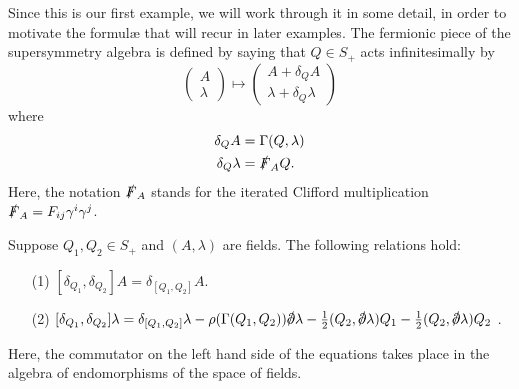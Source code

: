 \documentclass[10pt, oneside]{article}
\begin{document}
Since this is our first example, we will work through it in some detail, in order to motivate the formul\ae{} that will recur in later examples.  The fermionic piece of the supersymmetry algebra is defined by saying that $Q \in S_+$ acts infinitesimally by
\[
\begin{pmatrix}
A \\ \lambda
\end{pmatrix}
\mapsto
\begin{pmatrix} A + \delta_Q A \\
\lambda + \delta_Q \lambda
\end{pmatrix}
\]
where 
\begin{align*}
\delta_Q A &= \Gamma(Q,\lambda) \\
\delta_Q \lambda &= \slashed{F}_A Q .
\end{align*}
Here, the notation $\slashed{F}_A$ stands for the iterated Clifford multiplication $\slashed{F}_A = F_{ij} \gamma^i \gamma^j$. 

\begin{lemma} \label{10d_onshell_lemma}
Suppose $Q_1, Q_2 \in S_+$ and $(A, \lambda)$ are fields.
The following relations hold:
\begin{itemize}
\item[(1)] \label{10dsusyA} $ [\delta_{Q_1}, \delta_{Q_2}] A = \delta_{[Q_1, Q_2]} A$.
\item[(2)] \label{10dsusyL} $ [\delta_{Q_1}, \delta_{Q_2}] \lambda = \delta_{[Q_1,Q_2]} \lambda - \rho(\Gamma(Q_1,Q_2)) \sd \dd \lambda - \frac 12(Q_2, \sd \dd \lambda)Q_1 - \frac 12(Q_2, \sd \dd \lambda)Q_2$ .
\end{itemize}
Here, the commutator on the left hand side of the equations takes place in the algebra of endomorphisms of the space of fields.
\end{lemma}
\end{document}
